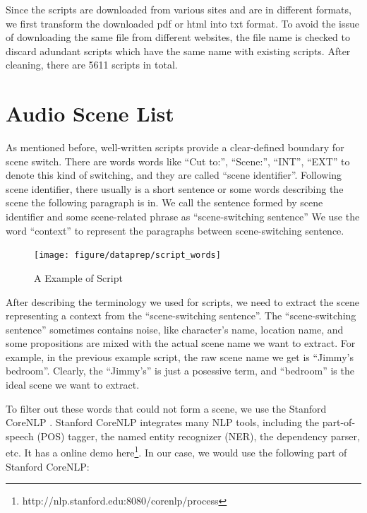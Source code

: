 Since the scripts are downloaded from various sites and are in different formats, we first transform the downloaded pdf or html into txt format. 
To avoid the issue of downloading the same file from different websites, the file name is checked to discard adundant scripts which have the same name with existing scripts. 
After cleaning, there are 5611 scripts in total. 

\section{Audio Scene List}
As mentioned before, well-written scripts provide a clear-defined boundary for scene switch. 
There are words words like ``Cut to:'', ``Scene:'', ``INT'', ``EXT'' to denote this kind of switching, and they are called ``scene identifier''.  
Following scene identifier, there usually is a short sentence or some words describing the scene the following paragraph is in. 
We call the sentence formed by scene identifier and some scene-related phrase as ``scene-switching sentence''
We use the word ``context'' to represent the paragraphs between scene-switching sentence. 

\begin{figure}[htb]
\centering
\hspace*{-0.5cm}
\texttt{[image: figure/dataprep/script\_words]}
\caption{A Example of Script}
\label{fig:script_words}
\end{figure}

After describing the terminology we used for scripts, we need to extract the scene representing a context from the ``scene-switching sentence''. 
The ``scene-switching sentence'' sometimes contains noise, like character's name, location name, and some propositions are mixed with the actual scene name we want to extract. 
For example, in the previous example script, the raw scene name we get is ``Jimmy's bedroom''. 
Clearly, the ``Jimmy's'' is just a posessive term, and ``bedroom'' is the ideal scene we want to extract. 

To filter out these words that could not form a scene, we use the Stanford CoreNLP \cite{manning2014corenlp}. 
Stanford CoreNLP integrates many NLP tools, including the part-of-speech (POS) tagger, the named entity recognizer (NER), the dependency parser, etc. 
It has a online demo here\footnote{http://nlp.stanford.edu:8080/corenlp/process}. 
In our case, we would use the following part of Stanford CoreNLP:
 
